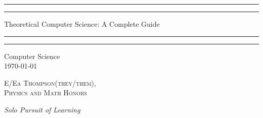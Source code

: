 \documentclass[12pt, a4paper, oneside, openright, titlepage]{book}
\begin{document}

\begin{titlepage}
    \centering
    \scshape
    \vspace*{\baselineskip}
    \rule{\textwidth}{1.6pt}\vspace*{-\baselineskip}\vspace*{2pt}
    \rule{\textwidth}{0.4pt}
    
    \vspace{0.75\baselineskip}
    
    {\LARGE Theoretical Computer Science: A Complete Guide}
    
    \vspace{0.75\baselineskip}
    
    \rule{\textwidth}{0.4pt}\vspace*{-\baselineskip}\vspace{3.2pt}
    \rule{\textwidth}{1.6pt}
    
    \vspace{2\baselineskip}
    Computer Science \\
    \vspace*{3\baselineskip}
    \monthdayyeardate\today \\
    \vspace*{5.0\baselineskip}
    
    {\scshape\Large E/Ea Thompson(they/them), \\ Physics and Math Honors\\}
    
    \vspace{1.0\baselineskip}
    \textit{Solo Pursuit of Learning}
    \vfill
    \enlargethispage{1in}
    \begin{figure}[b!]
    \end{figure}
\end{titlepage}
\end{document}
